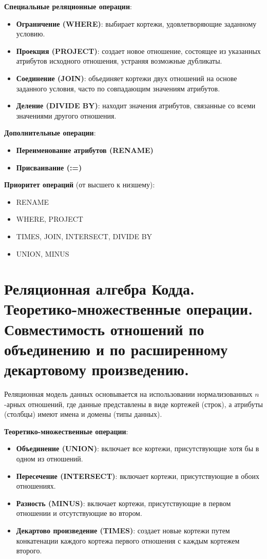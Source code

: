 \documentclass[a4paper,12pt]{article}
\begin{document}
\textbf{Специальные реляционные операции}:

\begin{itemize}
    \item \textbf{Ограничение (WHERE)}: выбирает кортежи, удовлетворяющие заданному условию.
    \item \textbf{Проекция (PROJECT)}: создает новое отношение, состоящее из указанных атрибутов исходного отношения, устраняя возможные дубликаты.
    \item \textbf{Соединение (JOIN)}: объединяет кортежи двух отношений на основе заданного условия, часто по совпадающим значениям атрибутов.
    \item \textbf{Деление (DIVIDE BY)}: находит значения атрибутов, связанные со всеми значениями другого отношения.
\end{itemize}

\textbf{Дополнительные операции}:

\begin{itemize}
    \item \textbf{Переименование атрибутов (RENAME)}
    \item \textbf{Присваивание (:=)}
\end{itemize}

\textbf{Приоритет операций} (от высшего к низшему):

\begin{itemize}
    \item RENAME
    \item WHERE, PROJECT
    \item TIMES, JOIN, INTERSECT, DIVIDE BY
    \item UNION, MINUS
\end{itemize}

\section{Реляционная алгебра Кодда. Теоретико-множественные операции. Совместимость отношений по объединению и по расширенному декартовому произведению.}

Реляционная модель данных основывается на использовании нормализованных $n$-арных отношений, где данные представлены в виде кортежей (строк), а атрибуты (столбцы) имеют имена и домены (типы данных).

\textbf{Теоретико-множественные операции}:

\begin{itemize}
    \item \textbf{Объединение (UNION)}: включает все кортежи, присутствующие хотя бы в одном из отношений.
    \item \textbf{Пересечение (INTERSECT)}: включает кортежи, присутствующие в обоих отношениях.
    \item \textbf{Разность (MINUS)}: включает кортежи, присутствующие в первом отношении и отсутствующие во втором.
    \item \textbf{Декартово произведение (TIMES)}: создает новые кортежи путем конкатенации каждого кортежа первого отношения с каждым кортежем второго.
\end{itemize}
\end{document}
